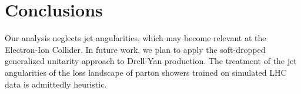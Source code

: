 \section{Conclusions}\label{sec:conclusions}

Our analysis neglects jet angularities, which may become relevant at the
Electron-Ion Collider. In future work, we plan to apply the soft-dropped
generalized unitarity approach to Drell-Yan production. The treatment of
the jet angularities of the loss landscape of parton showers trained on
simulated LHC data is admittedly heuristic.

